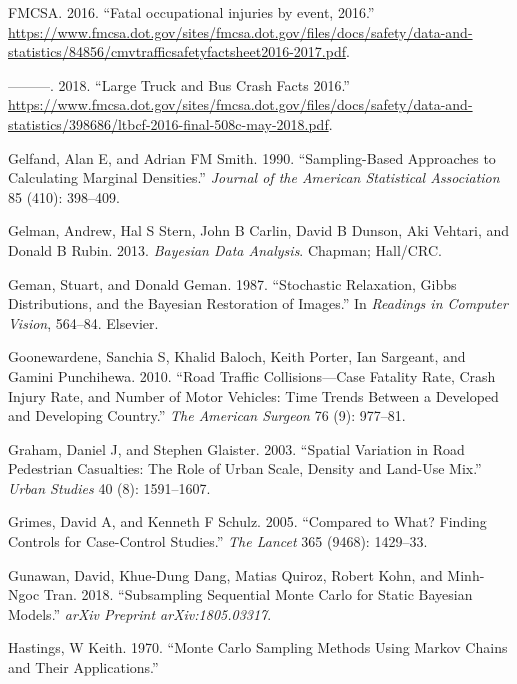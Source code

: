 \documentclass[12pt]{book}
\numberwithin{equation}{chapter}
\begin{document}
\leavevmode\hypertarget{ref-fmcsafacts2016}{}%
FMCSA. 2016. ``Fatal occupational injuries by event, 2016.'' \url{https://www.fmcsa.dot.gov/sites/fmcsa.dot.gov/files/docs/safety/data-and-statistics/84856/cmvtrafficsafetyfactsheet2016-2017.pdf}.

\leavevmode\hypertarget{ref-fmcsareport2016}{}%
---------. 2018. ``Large Truck and Bus Crash Facts 2016.'' \url{https://www.fmcsa.dot.gov/sites/fmcsa.dot.gov/files/docs/safety/data-and-statistics/398686/ltbcf-2016-final-508c-may-2018.pdf}.

\leavevmode\hypertarget{ref-gelfand1990sampling}{}%
Gelfand, Alan E, and Adrian FM Smith. 1990. ``Sampling-Based Approaches to Calculating Marginal Densities.'' \emph{Journal of the American Statistical Association} 85 (410): 398--409.

\leavevmode\hypertarget{ref-gelman2013bayesian}{}%
Gelman, Andrew, Hal S Stern, John B Carlin, David B Dunson, Aki Vehtari, and Donald B Rubin. 2013. \emph{Bayesian Data Analysis}. Chapman; Hall/CRC.

\leavevmode\hypertarget{ref-geman1987stochastic}{}%
Geman, Stuart, and Donald Geman. 1987. ``Stochastic Relaxation, Gibbs Distributions, and the Bayesian Restoration of Images.'' In \emph{Readings in Computer Vision}, 564--84. Elsevier.

\leavevmode\hypertarget{ref-goonewardene2010road}{}%
Goonewardene, Sanchia S, Khalid Baloch, Keith Porter, Ian Sargeant, and Gamini Punchihewa. 2010. ``Road Traffic Collisions---Case Fatality Rate, Crash Injury Rate, and Number of Motor Vehicles: Time Trends Between a Developed and Developing Country.'' \emph{The American Surgeon} 76 (9): 977--81.

\leavevmode\hypertarget{ref-graham2003spatial}{}%
Graham, Daniel J, and Stephen Glaister. 2003. ``Spatial Variation in Road Pedestrian Casualties: The Role of Urban Scale, Density and Land-Use Mix.'' \emph{Urban Studies} 40 (8): 1591--1607.

\leavevmode\hypertarget{ref-grimes2005compared}{}%
Grimes, David A, and Kenneth F Schulz. 2005. ``Compared to What? Finding Controls for Case-Control Studies.'' \emph{The Lancet} 365 (9468): 1429--33.

\leavevmode\hypertarget{ref-gunawan2018subsampling}{}%
Gunawan, David, Khue-Dung Dang, Matias Quiroz, Robert Kohn, and Minh-Ngoc Tran. 2018. ``Subsampling Sequential Monte Carlo for Static Bayesian Models.'' \emph{arXiv Preprint arXiv:1805.03317}.

\leavevmode\hypertarget{ref-hastings1970monte}{}%
Hastings, W Keith. 1970. ``Monte Carlo Sampling Methods Using Markov Chains and Their Applications.''
\end{document}
